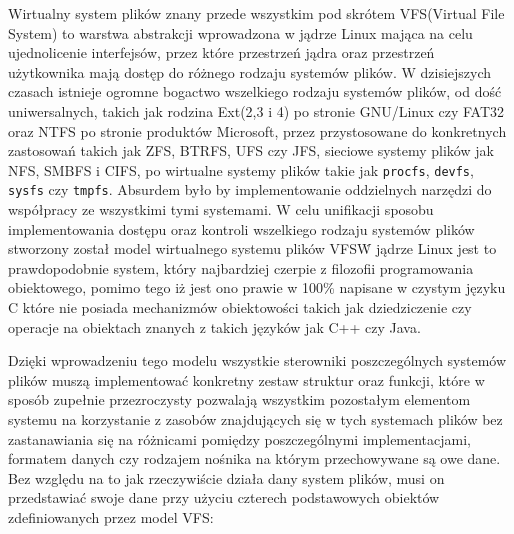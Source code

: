 \documentclass[10pt]{scrartcl}
\begin{document}
Wirtualny system plików znany przede wszystkim pod skrótem VFS(Virtual File System) to warstwa abstrakcji wprowadzona w jądrze Linux mająca na celu ujednolicenie interfejsów, przez które przestrzeń jądra oraz przestrzeń użytkownika mają dostęp do różnego rodzaju systemów plików. W dzisiejszych czasach istnieje ogromne bogactwo wszelkiego rodzaju systemów plików, od dość uniwersalnych, takich jak rodzina Ext(2,3 i 4) po stronie GNU/Linux czy FAT32 oraz NTFS po stronie produktów Microsoft, przez przystosowane do konkretnych zastosowań takich jak ZFS, BTRFS, UFS czy JFS, sieciowe systemy plików jak NFS, SMBFS i CIFS, po wirtualne systemy plików takie jak \texttt{procfs}, \texttt{devfs}, \texttt{sysfs} czy \texttt{tmpfs}. Absurdem było by implementowanie oddzielnych narzędzi do współpracy ze wszystkimi tymi systemami. W celu unifikacji sposobu implementowania dostępu oraz kontroli wszelkiego rodzaju systemów plików stworzony został model wirtualnego systemu plików VFS\. W jądrze Linux jest to prawdopodobnie system, który najbardziej czerpie z filozofii programowania obiektowego, pomimo tego iż jest ono prawie w 100\% napisane w czystym języku C które nie posiada mechanizmów obiektowości takich jak dziedziczenie czy operacje na obiektach znanych z takich języków jak C++ czy Java.

Dzięki wprowadzeniu tego modelu wszystkie sterowniki poszczególnych systemów plików muszą implementować konkretny zestaw struktur oraz funkcji, które w sposób zupełnie przezroczysty pozwalają wszystkim pozostałym elementom systemu na korzystanie z zasobów znajdujących się w tych systemach plików bez zastanawiania się na różnicami pomiędzy poszczególnymi implementacjami, formatem danych czy rodzajem nośnika na którym przechowywane są owe dane. Bez względu na to jak rzeczywiście działa dany system plików, musi on przedstawiać swoje dane przy użyciu czterech podstawowych obiektów zdefiniowanych przez model VFS:
\end{document}
